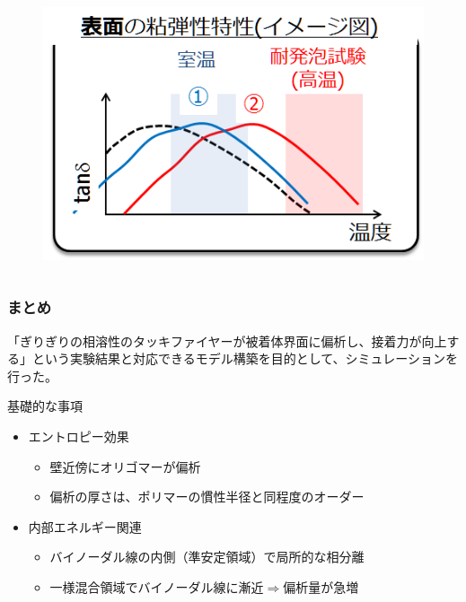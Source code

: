 \documentclass[unicode,12pt]{beamer}%
\begin{document}
\begin{frame}
\begin{columns}
\begin{column}{.48\textwidth}
		\vspace{-5mm}
		\begin{figure}[htbp]
			\begin{center}
				\includegraphics[width=.85\textwidth]{nakamura-3.png}
			\end{center}
		\end{figure}

	\end{column}
\end{columns}

\end{frame}


%
\begin{frame}\frametitle{まとめ}
「ぎりぎりの相溶性のタッキファイヤーが被着体界面に偏析し、接着力が向上する」という実験結果と対応できるモデル構築を目的として、シミュレーションを行った。

\begin{block}{基礎的な事項}
\begin{itemize}
	\item エントロピー効果
	\begin{itemize}
		\item 壁近傍にオリゴマーが偏析
		\item 偏析の厚さは、ポリマーの慣性半径と同程度のオーダー
	\end{itemize}
	\item 内部エネルギー関連
	\begin{itemize}
		\item バイノーダル線の内側（準安定領域）で局所的な相分離
		\item 一様混合領域でバイノーダル線に漸近$\Rightarrow$偏析量が急増
	\end{itemize}
\end{itemize}
\end{block}

\end{frame}
\end{document}
